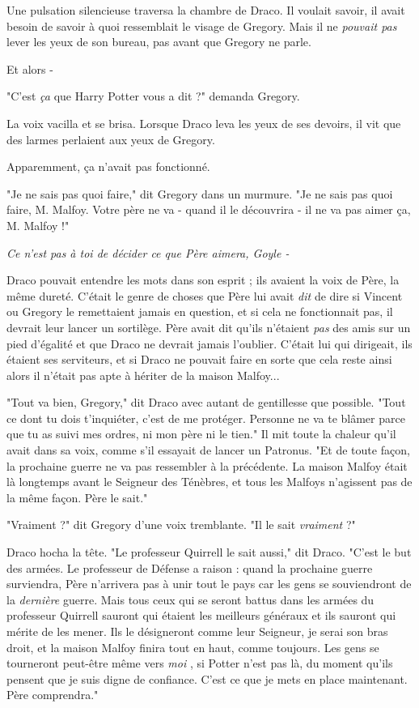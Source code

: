 Une pulsation silencieuse traversa la chambre de Draco. Il voulait savoir, il avait besoin de savoir à quoi ressemblait le visage de Gregory. Mais il ne \emph{pouvait pas}  lever les yeux de son bureau, pas avant que Gregory ne parle.

Et alors -

"C'est \emph{ça}  que Harry Potter vous a dit ?" demanda Gregory.

La voix vacilla et se brisa. Lorsque Draco leva les yeux de ses devoirs, il vit que des larmes perlaient aux yeux de Gregory.

Apparemment, ça n'avait pas fonctionné.

"Je ne sais pas quoi faire," dit Gregory dans un murmure. "Je ne sais pas quoi faire, M. Malfoy. Votre père ne va - quand il le découvrira - il ne va pas aimer ça, M. Malfoy !"

\emph{Ce n'est pas à toi de décider ce que Père aimera, Goyle -} 

Draco pouvait entendre les mots dans son esprit ; ils avaient la voix de Père, la même dureté. C'était le genre de choses que Père lui avait \emph{dit}  de dire si Vincent ou Gregory le remettaient jamais en question, et si cela ne fonctionnait pas, il devrait leur lancer un sortilège. Père avait dit qu'ils n'étaient \emph{pas } des amis sur un pied d'égalité et que Draco ne devrait jamais l'oublier. C'était lui qui dirigeait, ils étaient ses serviteurs, et si Draco ne pouvait faire en sorte que cela reste ainsi alors il n'était pas apte à hériter de la maison Malfoy...

"Tout va bien, Gregory," dit Draco avec autant de gentillesse que possible. "Tout ce dont tu dois t'inquiéter, c'est de me protéger. Personne ne va te blâmer parce que tu as suivi mes ordres, ni mon père ni le tien." Il mit toute la chaleur qu'il avait dans sa voix, comme s'il essayait de lancer un Patronus. "Et de toute façon, la prochaine guerre ne va pas ressembler à la précédente. La maison Malfoy était là longtemps avant le Seigneur des Ténèbres, et tous les Malfoys n'agissent pas de la même façon. Père le sait."

"Vraiment ?" dit Gregory d'une voix tremblante. "Il le sait \emph{vraiment } ?"

Draco hocha la tête. "Le professeur Quirrell le sait aussi," dit Draco. "C'est le but des armées. Le professeur de Défense a raison : quand la prochaine guerre surviendra, Père n'arrivera pas à unir tout le pays car les gens se souviendront de la \emph{dernière}  guerre. Mais tous ceux qui se seront battus dans les armées du professeur Quirrell sauront qui étaient les meilleurs généraux et ils sauront qui mérite de les mener. Ils le désigneront comme leur Seigneur, je serai son bras droit, et la maison Malfoy finira tout en haut, comme toujours. Les gens se tourneront peut-être même vers \emph{moi} , si Potter n'est pas là, du moment qu'ils pensent que je suis digne de confiance. C'est ce que je mets en place maintenant. Père comprendra."

